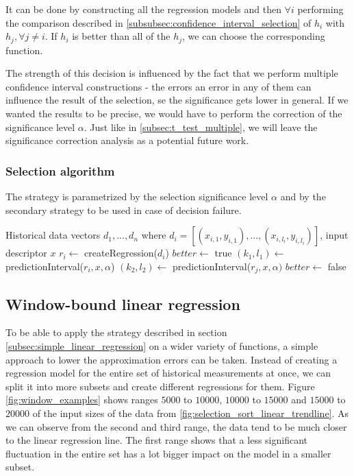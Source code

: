 It can be done by constructing all the regression models and then $\forall i$ performing the comparison described in \ref{subsubsec:confidence_interval_selection} of $h_i$ with $h_j, \forall j \ne i$. If $h_i$ is better than all of the $h_j$, we can choose the corresponding function.

The strength of this decision is influenced by the fact that we perform multiple confidence interval constructions - the errors an error in any of them can influence the result of the selection, se the significance gets lower in general. If we wanted the results to be precise, we would have to perform the correction of the significance level $\alpha$. Just like in \ref{subsec:t_test_multiple}, we will leave the significance correction analysis as a potential future work.

\subsubsection{Selection algorithm}

The strategy is parametrized by the selection significance level $\alpha$ and by the secondary strategy to be used in case of decision failure.

\begin{algorithmic}[1] %
	\INPUT Historical data vectors $d_1,...,d_n$ where $d_i = [(x_{i,1}, y_{i,1}),...,(x_{i,l_i}, y_{i,l_i})]$, input descriptor $x$
	\State $r_i \gets$ createRegression($d_i$) 
	\EndFor
	\State $better \gets$ true
	\State $(k_1, l_1) \gets$ predictionInterval($r_i, x, \alpha$)
	\State $(k_2, l_2) \gets$ predictionInterval($r_j, x, \alpha)$
	\State $better \gets$ false
	\EndIf
	\EndFor
	\State {}
	\EndIf
	\EndFor
	\State {}
\end{algorithmic}

\subsection{Window-bound linear regression}
\label{subsec:window_bound_regression}

To be able to apply the strategy described in section \ref{subsec:simple_linear_regression} on a wider variety of functions, a simple approach to lower the approximation errors can be taken. Instead of creating a regression model for the entire set of historical measurements at once, we can split it into more subsets and create different regressions for them. Figure \ref{fig:window_examples} shows ranges $5000$ to $10000$, $10000$ to $15000$ and $15000$ to $20000$ of the input sizes of the data from \ref{fig:selection_sort_linear_trendline}. As we can observe from the second and third range, the data tend to be much closer to the linear regression line. The first range shows that a less significant fluctuation in the entire set has a lot bigger impact on the model in a smaller subset.

